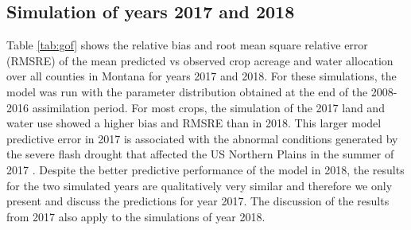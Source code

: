 



\subsection{Simulation of years 2017 and 2018}

Table \ref{tab:gof} shows the relative bias and root mean square relative error (RMSRE) of the mean predicted vs observed crop acreage and water allocation over all counties in Montana for years 2017 and 2018. For these simulations, the model was run with the parameter distribution obtained at the end of the 2008-2016 assimilation period. For most crops, the simulation of the 2017 land and water use showed a higher bias and RMSRE than in 2018. This larger model predictive error in 2017 is associated with the abnormal conditions generated by the severe flash drought that affected the US Northern Plains in the summer of 2017 \citep{He2019, Kimball2019}.  Despite the better predictive performance of the model in 2018, the results for the two simulated years are qualitatively very similar and therefore we only present and discuss the predictions for year 2017. The discussion of the results from 2017 also apply to the simulations of year 2018.        

